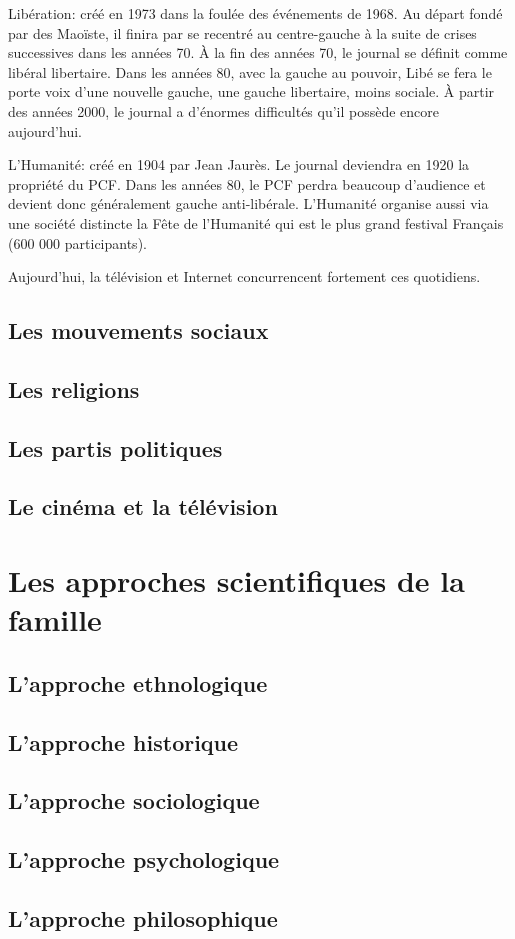 \documentclass[12pt, a4paper, openany]{book}
\begin{document}
Libération: créé en 1973 dans la foulée des événements de 1968. Au départ fondé par des Maoïste, il finira par se recentré au centre-gauche à la suite de crises successives dans les années 70. À la fin des années 70, le journal se définit comme libéral libertaire. Dans les années 80, avec la gauche au pouvoir, Libé se fera le porte voix d'une nouvelle gauche, une gauche libertaire, moins sociale. À partir des années 2000, le journal a d'énormes difficultés qu'il possède encore aujourd'hui.


L'Humanité: créé en 1904 par Jean Jaurès. Le journal deviendra en 1920 la propriété du PCF. Dans les années 80, le PCF perdra beaucoup d'audience et devient donc généralement gauche anti-libérale. L'Humanité organise aussi via une société distincte la Fête de l'Humanité qui est le plus grand festival Français (600 000 participants).


Aujourd'hui, la télévision et Internet concurrencent fortement ces quotidiens. 

\chapter{Les mouvements sociaux}








\chapter{Les religions}

\chapter{Les partis politiques}

\chapter{Le cinéma et la télévision}


\part{Les approches scientifiques de la famille}

\chapter{L'approche ethnologique}

\chapter{L'approche historique}

\chapter{L'approche sociologique}

\chapter{L'approche psychologique}

\chapter{L'approche philosophique}
\end{document}

